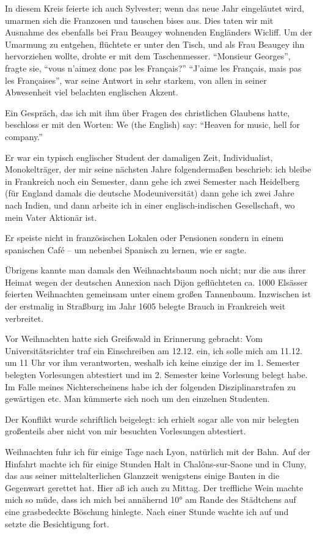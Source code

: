 In diesem Kreis feierte ich auch Sylvester; wenn das neue Jahr eingeläutet wird, umarmen sich die Franzosen und tauschen bises aus. Dies taten wir mit Ausnahme des ebenfalls bei Frau Beaugey wohnenden Engländers Wicliff. Um der Umarmung zu entgehen, flüchtete er unter den Tisch, und als Frau Beaugey ihn hervorziehen wollte, drohte er mit dem Taschenmesser. \enquote{Monsieur Georges}, fragte sie, \enquote{vous n'aimez donc pas les Français?} \enquote{J'aime les Français, mais pas les Françaises}, war seine Antwort in sehr starkem, von allen in seiner Abwesenheit viel belachten englischen Akzent.

Ein Gespräch, das ich mit ihm über Fragen des christlichen Glaubens hatte, beschloss er mit den Worten: We (the English) say: \enquote{Heaven for music, hell for company.}

Er war ein typisch englischer Student der damaligen Zeit, Individualist, Monokelträger, der mir seine nächsten Jahre folgendermaßen beschrieb: ich bleibe in Frankreich noch ein Semester, dann gehe ich zwei Semester nach Heidelberg (für England damals die deutsche Modeuniversität) dann gehe ich zwei Jahre nach Indien, und dann arbeite ich in einer englisch-indischen Gesellschaft, wo mein Vater Aktionär ist.

Er speiste nicht in französischen Lokalen oder Pensionen sondern in einem spanischen Café -- um nebenbei Spanisch zu lernen, wie er sagte.

Übrigens kannte man damals den Weihnachtsbaum noch nicht; nur die aus ihrer Heimat wegen der deutschen Annexion nach Dijon geflüchteten ca. \num{1000} Elsässer feierten Weihnachten gemeinsam unter einem großen Tannenbaum. Inzwischen ist der erstmalig in Straßburg im Jahr 1605 belegte Brauch in Frankreich weit verbreitet.

Vor Weihnachten hatte sich Greifswald in Erinnerung gebracht: Vom Universitätsrichter traf ein Einschreiben am 12.12. ein, ich solle mich am 11.12. um 11 Uhr vor ihm verantworten, weshalb ich keine einzige der im 1. Semester belegten Vorlesungen abtestiert und im 2. Semester keine Vorlesung belegt habe. Im Falle meines Nichterscheinens habe ich der folgenden Disziplinarstrafen zu gewärtigen etc. Man kümmerte sich noch um den einzelnen Studenten.

Der Konflikt wurde schriftlich beigelegt: ich erhielt sogar alle von mir belegten großenteils aber nicht von mir besuchten Vorlesungen abtestiert.

Weihnachten fuhr ich für einige Tage nach Lyon, natürlich mit der Bahn. Auf der Hinfahrt machte ich für einige Stunden Halt in Chalôns-sur-Saone und in Cluny, das aus seiner mittelalterlichen Glanzzeit wenigstens einige Bauten in die Gegenwart gerettet hat. Hier aß ich auch zu Mittag. Der treffliche Wein machte mich so müde, dass ich mich bei annähernd 10° am Rande des Städtchens auf eine grasbedeckte Böschung hinlegte. Nach einer Stunde wachte ich auf und setzte die Besichtigung fort.

